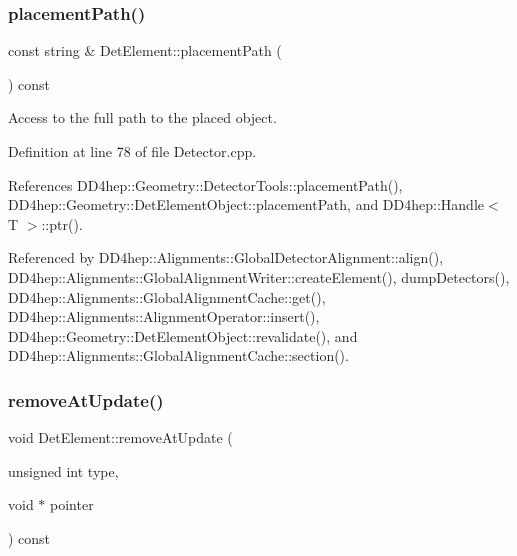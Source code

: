 \subsubsection{\texorpdfstring{placement\+Path()}{placementPath()}}
{\footnotesize\ttfamily const string \& Det\+Element\+::placement\+Path (\begin{DoxyParamCaption}{ }\end{DoxyParamCaption}) const}



Access to the full path to the placed object. 



Definition at line 78 of file Detector.\+cpp.



References D\+D4hep\+::\+Geometry\+::\+Detector\+Tools\+::placement\+Path(), D\+D4hep\+::\+Geometry\+::\+Det\+Element\+Object\+::placement\+Path, and D\+D4hep\+::\+Handle$<$ T $>$\+::ptr().



Referenced by D\+D4hep\+::\+Alignments\+::\+Global\+Detector\+Alignment\+::align(), D\+D4hep\+::\+Alignments\+::\+Global\+Alignment\+Writer\+::create\+Element(), dump\+Detectors(), D\+D4hep\+::\+Alignments\+::\+Global\+Alignment\+Cache\+::get(), D\+D4hep\+::\+Alignments\+::\+Alignment\+Operator\+::insert(), D\+D4hep\+::\+Geometry\+::\+Det\+Element\+Object\+::revalidate(), and D\+D4hep\+::\+Alignments\+::\+Global\+Alignment\+Cache\+::section().

\hypertarget{class_d_d4hep_1_1_geometry_1_1_det_element_a7faf425a1cc0a3d7e7029fbee97f6499}{}\label{class_d_d4hep_1_1_geometry_1_1_det_element_a7faf425a1cc0a3d7e7029fbee97f6499} 
\subsubsection{\texorpdfstring{remove\+At\+Update()}{removeAtUpdate()}}
{\footnotesize\ttfamily void Det\+Element\+::remove\+At\+Update (\begin{DoxyParamCaption}\item[{unsigned int}]{type,  }\item[{void $\ast$}]{pointer }\end{DoxyParamCaption}) const}



